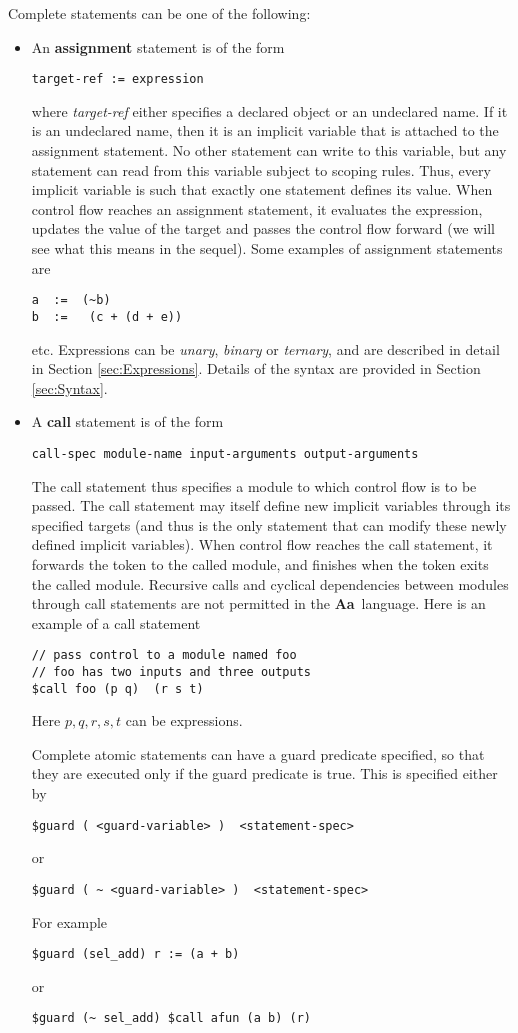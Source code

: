 \documentclass{article}
\newcommand{\Aa}{{\bf Aa}~}
\begin{document}
Complete statements can be one of the following:
\begin{itemize}
\item An {\bf assignment} statement is of the form
\begin{verbatim}
target-ref := expression
\end{verbatim}
where {\em target-ref} either specifies a declared object
or an undeclared name.  If it is an undeclared name, then
it is an implicit variable that is attached to the
assignment statement.  No other statement can write to this
variable, but any statement can read from this variable
subject to scoping rules.  Thus, every implicit variable
is such that exactly one statement defines its value.
When control flow reaches an assignment statement, it
evaluates the expression, updates the value of the target
and passes the control flow forward (we will see what this
means in the sequel).
Some examples of assignment statements are 
\begin{verbatim}
a  :=  (~b)
b  :=   (c + (d + e))
\end{verbatim}
etc.   Expressions can be {\em unary},
{\em binary} or {\em ternary}, and are
described in detail in Section \ref{sec:Expressions}.
Details of the syntax are provided in 
Section \ref{sec:Syntax}.
\item A {\bf call} statement is of the form
\begin{verbatim}
call-spec module-name input-arguments output-arguments
\end{verbatim}
The call statement thus specifies a module to which control flow
is to be passed.  The call statement may itself define new implicit
variables through its specified targets (and thus is the only
statement that can modify these newly defined implicit variables).
When control flow reaches the call statement, it forwards the
token to the called module, and finishes when the token exits
the called module.  Recursive calls and cyclical dependencies between
modules through call statements are not permitted in the \Aa language.
Here is an example of a call statement
\begin{verbatim}
// pass control to a module named foo
// foo has two inputs and three outputs
$call foo (p q)  (r s t)
\end{verbatim}
Here $p,q,r,s,t$ can be expressions.

Complete atomic statements can have a guard predicate
specified, so that they are executed only if the guard
predicate is true.  This is specified either by
\begin{verbatim}
$guard ( <guard-variable> )  <statement-spec>
\end{verbatim}
or 
\begin{verbatim}
$guard ( ~ <guard-variable> )  <statement-spec>
\end{verbatim}
For example
\begin{verbatim}
$guard (sel_add) r := (a + b)
\end{verbatim}
or
\begin{verbatim}
$guard (~ sel_add) $call afun (a b) (r)
\end{verbatim}



\end{itemize}
\end{document}

